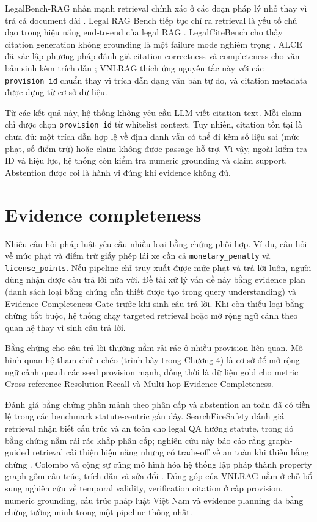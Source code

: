 \documentclass[a4paper,12pt]{extreport}
\newcommand{\code}[1]{\texttt{#1}}
\begin{document}
LegalBench-RAG nhấn mạnh retrieval chính xác ở các đoạn pháp lý nhỏ thay vì trả cả document dài \cite{pipitone2024legalbenchrag}. Legal RAG Bench tiếp tục chỉ ra retrieval là yếu tố chủ đạo trong hiệu năng end-to-end của legal RAG \cite{butler2026legalragbench}. LegalCiteBench cho thấy citation generation không grounding là một failure mode nghiêm trọng \cite{chen2026legalcitebench}. ALCE đã xác lập phương pháp đánh giá citation correctness và completeness cho văn bản sinh kèm trích dẫn \cite{gao2023alce}; VNLRAG thích ứng nguyên tắc này với các \code{provision\_id} chuẩn thay vì trích dẫn dạng văn bản tự do, và citation metadata được dựng từ cơ sở dữ liệu.

Từ các kết quả này, hệ thống không yêu cầu LLM viết citation text. Mỗi claim chỉ được chọn \code{provision\_id} từ whitelist context. Tuy nhiên, citation tồn tại là chưa đủ: một trích dẫn hợp lệ về định danh vẫn có thể đi kèm số liệu sai (mức phạt, số điểm trừ) hoặc claim không được passage hỗ trợ. Vì vậy, ngoài kiểm tra ID và hiệu lực, hệ thống còn kiểm tra numeric grounding và claim support. Abstention được coi là hành vi đúng khi evidence không đủ.

\section{Evidence completeness}

Nhiều câu hỏi pháp luật yêu cầu nhiều loại bằng chứng phối hợp. Ví dụ, câu hỏi về mức phạt và điểm trừ giấy phép lái xe cần cả \code{monetary\_penalty} và \code{license\_points}. Nếu pipeline chỉ truy xuất được mức phạt và trả lời luôn, người dùng nhận được câu trả lời nửa vời. Đề tài xử lý vấn đề này bằng evidence plan (danh sách loại bằng chứng cần thiết được tạo trong query understanding) và Evidence Completeness Gate trước khi sinh câu trả lời. Khi còn thiếu loại bằng chứng bắt buộc, hệ thống chạy targeted retrieval hoặc mở rộng ngữ cảnh theo quan hệ thay vì sinh câu trả lời.

Bằng chứng cho câu trả lời thường nằm rải rác ở nhiều provision liên quan. Mô hình quan hệ tham chiếu chéo (trình bày trong Chương 4) là cơ sở để mở rộng ngữ cảnh quanh các seed provision mạnh, đồng thời là dữ liệu gold cho metric Cross-reference Resolution Recall và Multi-hop Evidence Completeness.

Đánh giá bằng chứng phân mảnh theo phân cấp và abstention an toàn đã có tiền lệ trong các benchmark statute-centric gần đây. SearchFireSafety đánh giá retrieval nhận biết cấu trúc và an toàn cho legal QA hướng statute, trong đó bằng chứng nằm rải rác khắp phân cấp; nghiên cứu này báo cáo rằng graph-guided retrieval cải thiện hiệu năng nhưng có trade-off về an toàn khi thiếu bằng chứng \cite{chae2026searchfire}. Colombo và cộng sự cũng mô hình hóa hệ thống lập pháp thành property graph gồm cấu trúc, trích dẫn và sửa đổi \cite{colombo2024legislative}. Đóng góp của VNLRAG nằm ở chỗ bổ sung nghiên cứu về temporal validity, verification citation ở cấp provision, numeric grounding, cấu trúc pháp luật Việt Nam và evidence planning đa bằng chứng tường minh trong một pipeline thống nhất.
\end{document}
